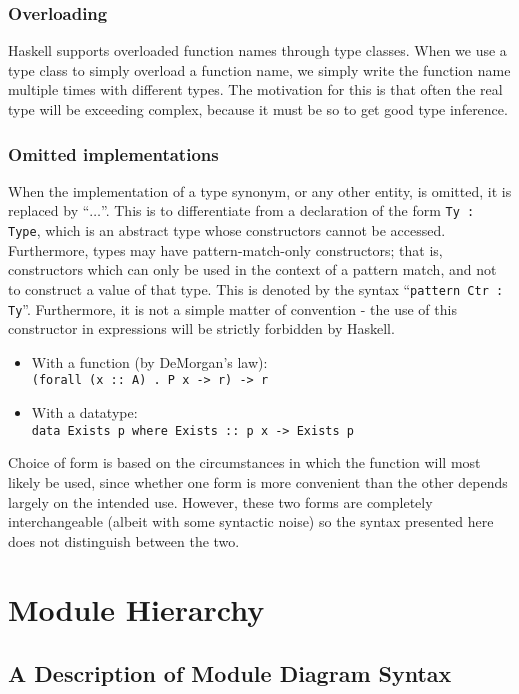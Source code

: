 \subsubsection*{Overloading}
Haskell supports overloaded function names through type classes. When we use a 
type 
class to simply overload a function name, we simply write the function name
multiple times with different types. The motivation for this is that often the 
real type will be exceeding complex, because it must be so to get good type 
inference. 

 

\subsubsection*{Omitted implementations}
When the implementation of a type synonym, or any other entity, is omitted, it
is replaced by ``$\ldots$''. This is to differentiate from a declaration of the 
form
\lstinline!Ty : Type!, which is an abstract type whose constructors cannot be
accessed. Furthermore, types may have pattern-match-only constructors; that is,
constructors which can only be used in the context of a pattern match, and not
to construct a value of that type. This is denoted by the syntax
``\lstinline!pattern Ctr : Ty!''. Furthermore, it is not a simple matter of
convention - the use of this constructor in expressions will be strictly
forbidden by Haskell.


\begin{itemize}
    \item With a function (by DeMorgan's law): \\ \texttt{(forall (x :: A) . P 
    x -> r) -> r}
    \item With a datatype: \\ \texttt{data Exists p where Exists :: p x -> 
    Exists p}
\end{itemize} 

Choice of form is based on the circumstances in which the function
will most likely be used, since whether one form is more convenient than the
other depends largely on the intended use. However, these two forms are
completely interchangeable (albeit with some syntactic noise) so the syntax
presented here does not distinguish between the two. 

\section{Module Hierarchy}
\subsection{A Description of Module Diagram Syntax}\label{subsec:ModuleSyntax}

